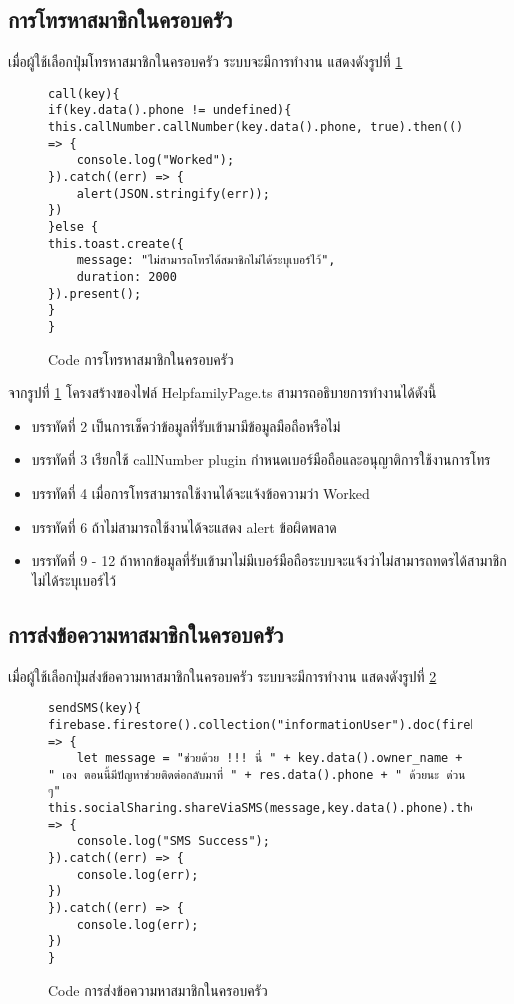 

\subsection{การโทรหาสมาชิกในครอบครัว}
เมื่อผู้ใช้เลือกปุ่มโทรหาสมาชิกในครอบครัว ระบบจะมีการทำงาน แสดงดังรูปที่ \ref{Fig:4-call}

\begin{figure}[H]
{\lstset{language=Pascal}
\begin{lstlisting}
call(key){
if(key.data().phone != undefined){
this.callNumber.callNumber(key.data().phone, true).then(() => {
	console.log("Worked");
}).catch((err) => {
	alert(JSON.stringify(err));
})
}else {
this.toast.create({
	message: "ไม่สามารถโทรได้สมาชิกไม่ได้ระบุเบอร์ไว้",
	duration: 2000
}).present();
}
}
\end{lstlisting}}
\caption{Code การโทรหาสมาชิกในครอบครัว}
\label{Fig:4-call}
\end{figure}

จากรูปที่ \ref{Fig:4-call} โครงสร้างของไฟล์ HelpfamilyPage.ts สามารถอธิบายการทำงานได้ดังนี้
\begin{itemize}[label={--}]
\item บรรทัดที่ 2 เป็นการเช็คว่าข้อมูลที่รับเข้ามามีข้อมูลมือถือหรือไม่
\item บรรทัดที่ 3 เรียกใช้ callNumber plugin กำหนดเบอร์มือถือและอนุญาติการใช้งานการโทร
\item บรรทัดที่ 4 เมื่อการโทรสามารถใช้งานได้จะแจ้งข้อความว่า Worked
\item บรรทัดที่ 6 ถ้าไม่สามารถใช้งานได้จะแสดง alert ข้อผิดพลาด
\item บรรทัดที่ 9 - 12 ถ้าหากข้อมูลที่รับเข้ามาไม่มีเบอร์มือถือระบบจะแจ้งว่าไม่สามารถทดรได้สามาชิกไม่ได้ระบุเบอร์ไว้
\end{itemize}
\newpage


\subsection{การส่งข้อความหาสมาชิกในครอบครัว}
เมื่อผู้ใช้เลือกปุ่มส่งข้อความหาสมาชิกในครอบครัว ระบบจะมีการทำงาน แสดงดังรูปที่ \ref{Fig:4-sms}

\begin{figure}[H]
{\lstset{language=Pascal}
\begin{lstlisting}
sendSMS(key){
firebase.firestore().collection("informationUser").doc(firebase.auth().currentUser.uid).get().then((res) => {
	let message = "ช่วยด้วย !!! นี่ " + key.data().owner_name + " เอง ตอนนี้มีปัญหาช่วยติดต่อกลับมาที่ " + res.data().phone + " ด้วยนะ ด่วน ๆ"   
this.socialSharing.shareViaSMS(message,key.data().phone).then(() => {
	console.log("SMS Success");
}).catch((err) => {
	console.log(err);
})
}).catch((err) => {
	console.log(err);
})
}
\end{lstlisting}}
\caption{Code การส่งข้อความหาสมาชิกในครอบครัว}
\label{Fig:4-sms}
\end{figure}

